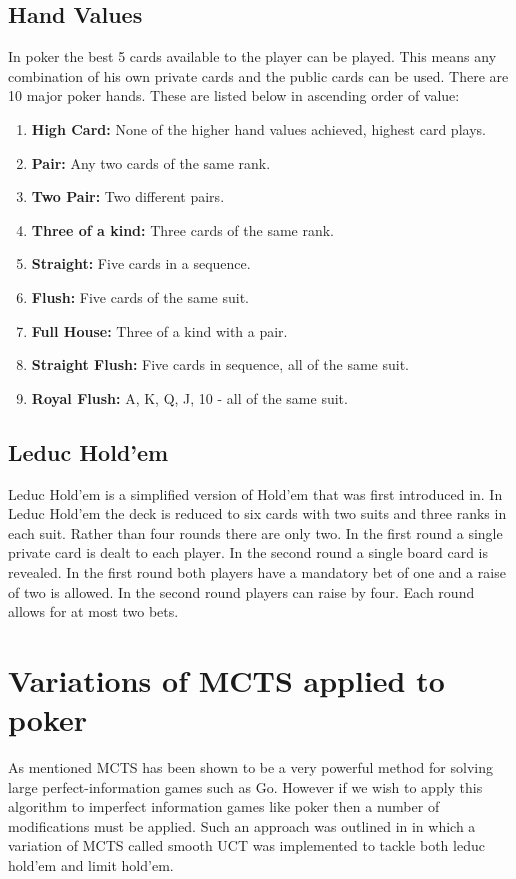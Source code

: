 \subsection{Hand Values}\label{subsec:handValues}
In poker the best 5 cards available to the player can be played.
This means any combination of his own private cards and the public cards can be used.
There are 10 major poker hands.
These are listed below in ascending order of value:
\begin{enumerate}
    \item \textbf{High Card:} None of the higher hand values achieved, highest card plays.
    \item \textbf{Pair:} Any two cards of the same rank.
    \item \textbf{Two Pair:} Two different pairs.
    \item \textbf{Three of a kind:} Three cards of the same rank.
    \item \textbf{Straight:} Five cards in a sequence.
    \item \textbf{Flush:} Five cards of the same suit.
    \item \textbf{Full House:} Three of a kind with a pair.
    \item \textbf{Straight Flush:} Five cards in sequence, all of the same suit.
    \item \textbf{Royal Flush:} A, K, Q, J, 10 - all of the same suit.
\end{enumerate}

\subsection{Leduc Hold'em}\label{subsec:leducHoldem}
Leduc Hold'em is a simplified version of Hold'em that was first introduced in\citep{southey2012bayes}.
In Leduc Hold'em the deck is reduced to six cards with two suits and three ranks in each suit.
Rather than four rounds there are only two.
In the first round a single private card is dealt to each player.
In the second round a single board card is revealed.
In the first round both players have a mandatory bet of one and a raise of two is allowed.
In the second round players can raise by four.
Each round allows for at most two bets.


\section{Variations of MCTS applied to poker}\label{sec:mctsPoker}
As mentioned MCTS has been shown to be a very powerful method for solving large perfect-information
games such as Go.
However if we wish to apply this algorithm to imperfect information games like poker then 
a number of modifications must be applied.
Such an approach was outlined in\citep{heinrich2017reinforcement} in which a variation of
MCTS called smooth UCT was implemented to tackle both leduc hold'em and limit hold'em.

